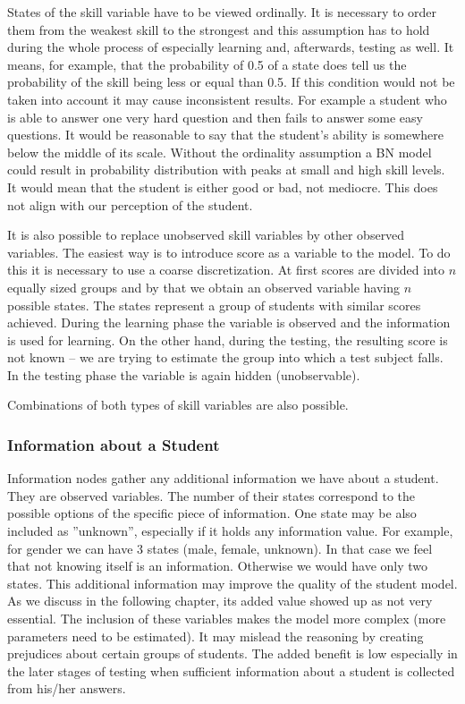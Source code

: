 States of the skill variable have to be viewed ordinally. It is necessary to order them from the weakest skill to the strongest and this assumption has to hold during the whole process of especially learning and, afterwards, testing as well. It means, for example, that the probability of 0.5 of a state does tell us the probability of the skill being less or equal than 0.5. If this condition would not be taken into account it may cause inconsistent results. For example a student who is able to answer one very hard question and then fails to answer some easy questions. It would be reasonable to say that the student's ability is somewhere below the middle of its scale. Without the ordinality assumption a BN model could result in probability distribution with peaks at small and high skill levels. It would mean that the student is either good or bad, not mediocre. This does not align with our perception of the student.

\label{observed_score}
It is also possible to replace unobserved skill variables by other observed variables. The easiest way is to introduce score as a variable to the model. To do this it is necessary to use a coarse discretization. At first scores are divided into $n$ equally sized groups and by that we obtain an observed variable having $n$ possible states. The states represent a group of students with similar scores achieved. During the learning phase the variable is observed and the information is used for learning. On the other hand, during the testing, the resulting score is not known -- we are trying to estimate the group into which a test subject falls. In the testing phase the variable is again hidden (unobservable).

Combinations of both types of skill variables are also possible.

\subsubsection{Information about a Student}
Information nodes gather any additional information we have about a student. They are observed variables. The number of their states correspond to the possible options of the specific piece of information. One state may be also included as ''unknown'', especially if it holds any information value. For example, for gender we can have 3 states (male, female, unknown). In that case we feel that not knowing itself is an information. Otherwise we would have only two states.
This additional information may improve the quality of the student model. As we discuss in the following chapter, its added value showed up as not very essential. The inclusion of these variables makes the model more complex (more parameters need to be estimated). It may mislead the reasoning by creating prejudices about certain groups of students. The added benefit is low especially in the later stages of testing when sufficient information about a student is collected from his/her answers. 


